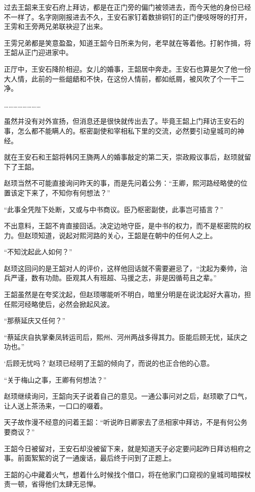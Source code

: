 过去王韶来王安石府上拜访，都是在正门旁的偏门被领进去，而今天他的身份已经不一样了。名字刚刚报进去不久，王安石家钉着数排铜钉的正门便吱呀呀的打开，王雱和王旁两兄弟联袂迎了出来。

王雱兄弟都是笑意盈盈，知道王韶今日所来为何，老早就在等着他。打躬作揖，将王韶从正门迎进家中。

正厅中，王安石降阶相迎。女儿的婚事，王韶居中奔走。王安石也算是欠了他一份大人情，此前的一些龃龉和不快，在这份人情前，都如纸屑，被风吹了个一干二净。

……………………

虽然并没有对外宣扬，但消息还是很快就传出去了。毕竟王韶上门拜访王安石的事，怎么都不能瞒人的。枢密副使和宰相私下里的交流，必然要引动皇城司的神经。

就在王安石和王韶将韩冈王旖两人的婚事敲定的第二天，崇政殿议事后，赵顼就留下了王韶。

赵顼当然不可能直接询问昨天的事，而是先问着公务：“王卿，熙河路经略使的位置该定下来了，不知你有何想法？”

“此事全凭陛下处断，又或与中书商议。臣乃枢密副使，此事岂可插言？”

不出意料，王韶不肯直接回话。决定边地守臣，是中书的权力，而不是枢密院的权力。但赵顼知道，说起对熙河路的关心，王韶是在朝中的任何人之上。

“不知沈起此人如何？”

赵顼这回问的是王韶对人的评价，这样他回话就不需要避忌了，“沈起为秦帅，治兵严谨，数有功勋。臣观其人有班超、马援之志，非是因循苟且之辈。”

王韶虽然是在夸奖沈起，但赵顼哪能听不明白，暗里分明是在说沈起好大喜功，担任熙河经略使后，必然会掀起风波。

“那蔡延庆又任何？”

“蔡延庆自执掌秦凤转运司后，熙州、河州两战多得其力。臣能后顾无忧，延庆之功也。”

‘后顾无忧吗？’赵顼已经明了王韶的倾向了，而说的也正合他的心意。

“关于梅山之事，王卿有何想法？”

赵顼继续询问，王韶向天子说着自己的意见。一通公事问对之后，赵顼歇了口气，让人送上茶汤来，一口口的啜着。

天子故作漫不经意的问着王韶：“听说昨日卿家去了丞相家中拜访，不是有何公务要商议？”

王韶今日被留对，王安石却没被留下来，就是知道天子必定要问起昨日拜访相府之事。前面絮絮的说了一通废话，最后终于问到了正题上。

王韶的心中藏着火气，想着什么时候找个借口，将在他家门口窥视的皇城司暗探杖责一顿，省得他们太肆无忌惮。

